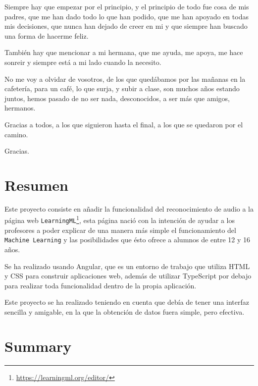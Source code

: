 \documentclass[a4paper, 12pt]{book}
\begin{document}
Siempre hay que empezar por el principio, y el principio de todo fue cosa de mis padres, que me han dado todo lo que han podido, que me han apoyado en todas mis decisiones, que nunca han dejado de creer en mi y que siempre han buscado una forma de hacerme feliz.

También hay que mencionar a mi hermana, que me ayuda, me apoya, me hace sonreir y siempre está a mi lado cuando la necesito.

No me voy a olvidar de vosotros, de los que quedábamos por las mañanas en la cafetería, para un café, lo que surja, y subir a clase, son muchos años estando juntos, hemos pasado de no ser nada, desconocidos, a ser más que amigos, hermanos.

Gracias a todos, a los que siguieron hasta el final, a los que se quedaron por el camino.

Gracias.


\chapter*{Resumen}

Este proyecto consiste en añadir la funcionalidad del reconocimiento de audio a la página web \texttt{LearningML}\footnote{\url{https://learningml.org/editor/}}, esta página nació con la intención de ayudar a los profesores a poder explicar de una manera más simple el funcionamiento del \texttt{Machine Learning} y las posibilidades que ésto ofrece a alumnos de entre 12 y 16 años.

Se ha realizado usando Angular, que es un entorno de trabajo que utiliza HTML y CSS para construir aplicaciones web, además de utilizar TypeScript por debajo para realizar toda funcionalidad dentro de la propia aplicación.

Este proyecto se ha realizado teniendo en cuenta que debía de tener una interfaz sencilla y amigable, en la que la obtención de datos fuera simple, pero efectiva.


\chapter*{Summary}
\end{document}
